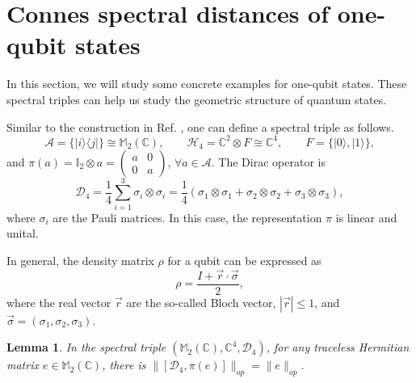\documentclass[a4paper,12pt]{article}
\newtheorem{lemma}{Lemma}
\begin{document}
\section{Connes spectral distances of one-qubit states}\label{sec6}
In this section, we will study some concrete examples for one-qubit states. These spectral triples can help us study the geometric structure of quantum states.

Similar to the construction in Ref. \cite{LX}, one can define a spectral
triple as follows.
\begin{equation}
	\mathcal{A}= \{ |i \rangle
	\langle j| \}\cong\mathbb{M}_2 (\mathbb{C}) ,\qquad \mathcal{H}_4  =\mathbb{C}^2 \otimes F\cong\mathbb{C}^4,\qquad F = \{
|0 \rangle, |1 \rangle \},
\end{equation}
and $\pi (a) =\mathbb{I}_2 \otimes a = \left(
\begin{array}{cc}
  a & 0\\
  0 & a
\end{array} \right)$, $\forall a \in \mathcal{A}$. The Dirac operator is
\begin{equation}\label{dd4}
  \mathcal{D}_4 = \frac{1}{4}  \sum_{i = 1}^3 \sigma_i \otimes \sigma_i =
  \frac{1}{4}  (\sigma_1 \otimes \sigma_1 + \sigma_2 \otimes \sigma_2 +
  \sigma_3 \otimes \sigma_3),
\end{equation}
where $\sigma_i$ are the Pauli matrices. In this case, the representation
$\pi$ is linear and unital.

In general, the density matrix $\rho$ for a qubit can be expressed as
\cite{Nielsen}
\begin{equation}
  \label{rr} \rho = \frac{I + \vec{r} \cdot \vec{\sigma}}{2},
\end{equation}
where the real vector $\vec{r}$ are the so-called Bloch vector, $|
\vec{r} | \leqslant 1$, and $\vec{\sigma} = (\sigma_1, \sigma_2, \sigma_3)$.

\begin{lemma}
  In the spectral triple $(\mathbb{M}_2 (\mathbb{C}), \mathbb{C}^4,
  \mathcal{D}_4)$, for any traceless Hermitian matrix $e \in \mathbb{M}_2
  (\mathbb{C})$, there is $\|[\mathcal{D}_4, \pi (e)]\|_{op} = \|e\|_{op}$.
\end{lemma}
\end{document}
